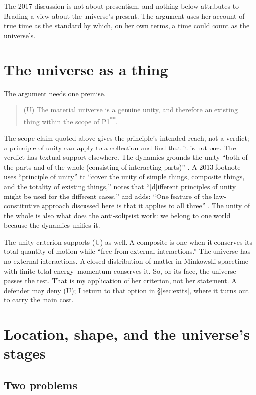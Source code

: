 \documentclass[11pt]{article}
\begin{document}
The 2017 discussion is not about presentism, and nothing below attributes to
Brading a view about the universe's present. The argument uses her account of
true time as the standard by which, on her own terms, a time could count as the
universe's.

\section{The universe as a thing}\label{sec:unity}

The argument needs one premise.

\begin{quote}
(U) The material universe is a genuine unity, and therefore an existing thing
within the scope of P1\textsuperscript{**}.
\end{quote}

The scope claim quoted above gives the principle's intended reach, not a
verdict; a principle of unity can apply to a collection and find that it is
not one. The verdict has textual support elsewhere. The dynamics grounds the
unity ``both of the parts and of the whole (consisting of interacting parts)''
\citep[p.~1110]{Brading2013}. A 2013 footnote uses ``principle of unity'' to
``cover the unity of simple things, composite things, and the totality of
existing things,'' notes that ``[d]ifferent principles of unity might be used
for the different cases,'' and adds: ``One feature of the law-constitutive
approach discussed here is that it applies to all three''
\citep[p.~1105, n.~3]{Brading2013}. The unity of the whole is also what does
the anti-solipsist work: we belong to one world because the dynamics unifies
it.

The unity criterion supports (U) as well. A composite is one when it conserves
its total quantity of motion while ``free from external interactions.'' The
universe has no external interactions. A closed distribution of matter in
Minkowski spacetime with finite total energy--momentum conserves it. So, on
its face, the universe passes the test. That is my application of her
criterion, not her statement. A defender may deny (U); I return to that option
in \S\ref{sec:exits}, where it turns out to carry the main cost.

\section{Location, shape, and the universe's stages}\label{sec:shape}

\subsection{Two problems}
\end{document}
